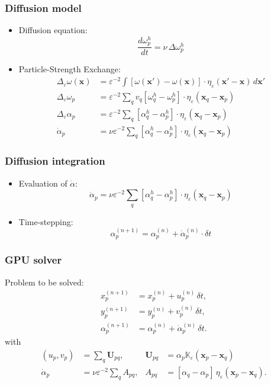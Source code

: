 \documentclass[12pt,english]{beamer}
\newcommand{\K}{\mathbb{K}}  %
\renewcommand{\vec}{\mathbf}
\newcommand{\x}{\vec x}      %
\newcommand{\od}[2]{\frac{d#1}{d#2}}
\begin{document}
  \begin{frame}
    \frametitle{Diffusion model}
    \begin{itemize}
      \item Diffusion equation:
        \begin{equation}
          \od{ω^h_p}{t} = ν\,Δω^h_p
        \end{equation}
      \item Particle-Strength Exchange:
        \begin{align}
          Δ_ε ω(\x) &= ε^{-2} \int [ω(\x') - ω(\x)]\cdot η_ε(\x' - \x)\,d\x' \\
          Δ_ε ω_p &= ε^{-2} \sum_q v_q [ω_q^h - ω_p^h]\cdot η_ε(\x_q - \x_p) \\
          Δ_ε α_p &= ε^{-2} \sum_q [α_q^h - α_p^h]\cdot η_ε(\x_q - \x_p) \\
          \dot{α}_p &= νε^{-2} \sum_q [α_q^h - α_p^h]\cdot η_ε(\x_q - \x_p)
        \end{align}
    \end{itemize}
  \end{frame}

  \begin{frame}
    \frametitle{Diffusion integration}
    \begin{itemize}
      \item Evaluation of \(\dot{α}\):
        \begin{equation}
          \dot{α}_p = νε^{-2} \sum_q [α_q^h - α_p^h]\cdot η_ε(\x_q - \x_p)
        \end{equation}
      \item Time-stepping:
        \begin{equation}
          α_p^{(n + 1)} = α_p^{(n)} + \dot{α}_p^{(n)}\cdot δt
        \end{equation}
    \end{itemize}
  \end{frame}

  \begin{frame}
    \frametitle{GPU solver}
    Problem to be solved:
    \begin{align}
      x_p^{(n + 1)} &= x_p^{(n)} + u_p^{(n)}\, δt, \\
      y_p^{(n + 1)} &= y_p^{(n)} + v_p^{(n)}\, δt, \\
      α_p^{(n + 1)} &= α_p^{(n)} + \dot{α}_p^{(n)}\, δt.
    \end{align}
    with
    \begin{align}
        (u_p, v_p) &= \sum_q \vec{U}_{pq},   & \vec{U}_{pq} &= α_p \K_ε(\x_p - \x_q) \\
        \dot{α}_p  &= νε^{-2} \sum_q A_{pq}, &       A_{pq} &= [α_q - α_p]\,η_ε(\x_p - \x_q).
    \end{align}
  \end{frame}
\end{document}
